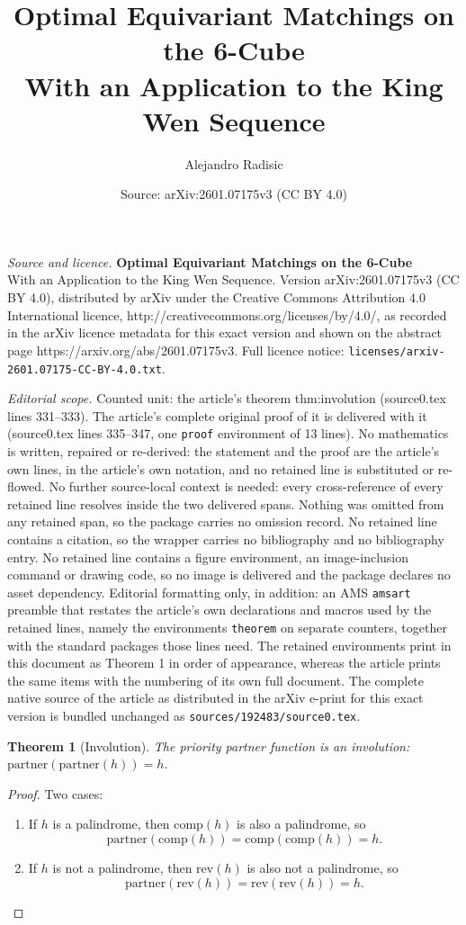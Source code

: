 \documentclass[10pt,a4paper]{amsart}
\title{\textbf{Optimal Equivariant Matchings on the 6-Cube}\\[0.3em] \large With an Application to the King Wen Sequence}
\author{Alejandro Radisic}
\date{Source: arXiv:2601.07175v3 (CC BY 4.0)}
\newtheorem{theorem}{Theorem}
\newcommand{\comp}{\mathrm{comp}}
\newcommand{\rev}{\mathrm{rev}}
\begin{document}
\maketitle

\noindent\emph{Source and licence.} \textbf{Optimal Equivariant Matchings on the 6-Cube}\\[0.3em] \large With an Application to the King Wen Sequence. Version arXiv:2601.07175v3 (CC BY 4.0), distributed by arXiv under the Creative Commons Attribution 4.0 International licence, http://creativecommons.org/licenses/by/4.0/, as recorded in the arXiv licence metadata for this exact version and shown on the abstract page https://arxiv.org/abs/2601.07175v3. Full licence notice: \texttt{licenses/arxiv-2601.07175-CC-BY-4.0.txt}.\par\smallskip

\noindent\textit{Editorial scope.} Counted unit: the article's theorem thm:involution (source0.tex lines 331--333). The article's complete original proof of it is delivered with it (source0.tex lines 335--347, one \texttt{proof} environment of 13 lines). No mathematics is written, repaired or re-derived: the statement and the proof are the article's own lines, in the article's own notation, and no retained line is substituted or re-flowed.  No further source-local context is needed: every cross-reference of every retained line resolves inside the two delivered spans.  Nothing was omitted from any retained span, so the package carries no omission record.  No retained line contains a citation, so the wrapper carries no bibliography and no bibliography entry.  No retained line contains a figure environment, an image-inclusion command or drawing code, so no image is delivered and the package declares no asset dependency.  Editorial formatting only, in addition: an AMS \texttt{amsart} preamble that restates the article's own declarations and macros used by the retained lines, namely the environments \texttt{theorem} on separate counters, together with the standard packages those lines need.  The retained environments print in this document as Theorem 1 in order of appearance, whereas the article prints the same items with the numbering of its own full document.  The complete native source of the article as distributed in the arXiv e-print for this exact version is bundled unchanged as \texttt{sources/192483/source0.tex}.
\begin{theorem}[Involution]\label{thm:involution}
The priority partner function is an involution: $\mathrm{partner}(\mathrm{partner}(h)) = h$.
\end{theorem}

\begin{proof}
Two cases:
\begin{enumerate}
    \item If $h$ is a palindrome, then $\comp(h)$ is also a palindrome, so
    \[
    \mathrm{partner}(\comp(h))=\comp(\comp(h))=h.
    \]
    \item If $h$ is not a palindrome, then $\rev(h)$ is also not a palindrome, so
    \[
    \mathrm{partner}(\rev(h))=\rev(\rev(h))=h.
    \]
\end{enumerate}
\end{proof}
\end{document}
